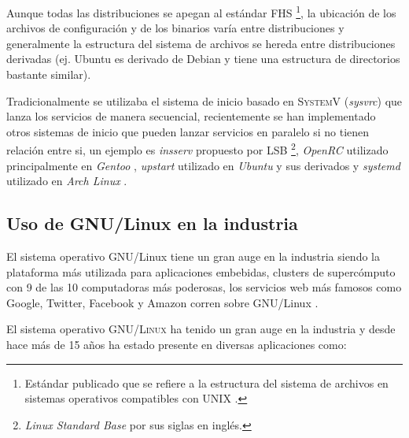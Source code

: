 Aunque todas las distribuciones se apegan al est\'{a}ndar \textsc{FHS} \cite{_filesystem_????} \footnote{Est\'{a}ndar publicado que se refiere a la estructura del sistema de archivos en sistemas operativos compatibles con UNIX \cite{_fhs_????}.}, la ubicaci\'{o}n de los archivos de configuraci\'{o}n y de los binarios var\'{i}a entre distribuciones y generalmente la estructura del sistema de archivos se hereda entre distribuciones derivadas (ej. Ubuntu es derivado de Debian y tiene una estructura de directorios bastante similar).

Tradicionalmente se utilizaba el sistema de inicio basado en \textsc{SystemV} (\textit{sysvrc}) que lanza los servicios de manera secuencial, recientemente se han implementado otros sistemas de inicio que pueden lanzar servicios en paralelo si no tienen relaci\'{o}n entre si, un ejemplo es \textit{insserv} propuesto por \textsc{LSB} \cite{_lsbinitscripts_????}\cite{_lsbinitscripts/dependencybasedboot_????} \footnote{\textit{Linux Standard Base} por sus siglas en ingl\'{e}s.}, \textit{OpenRC} utilizado principalmente en \textit{Gentoo} \cite{_gentoo_????}\cite{_openrc_????}\cite{_openrc_????-1}, \textit{upstart} utilizado en \textit{Ubuntu} y sus derivados \cite{_upstart_????} y \textit{systemd} utilizado en \textit{Arch Linux} \cite{_systemd_????}.


  \subsection {Uso de GNU/Linux en la industria}

El sistema operativo GNU/Linux tiene un gran auge en la industria siendo la plataforma m\'{a}s utilizada para aplicaciones embebidas, clusters de superc\'{o}mputo con 9 de las 10 computadoras m\'{a}s poderosas, los servicios web m\'{a}s famosos como Google, Twitter, Facebook y Amazon corren sobre GNU/Linux \cite{_how_????}.

El sistema operativo \textsc{GNU/Linux} ha tenido un gran auge en la industria y desde hace m\'{a}s de 15 a\~{n}os ha estado presente en diversas aplicaciones como:

